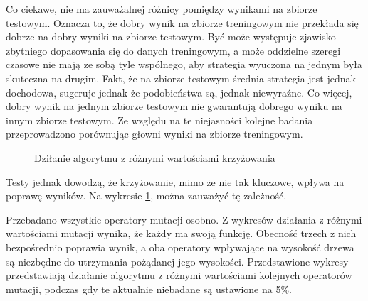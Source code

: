 \documentclass[twoside]{iisthesis}
\begin{document}
Co ciekawe, nie ma zauważalnej różnicy pomiędzy wynikami na zbiorze testowym. Oznacza to, że dobry wynik na zbiorze treningowym nie przekłada się dobrze na dobry wyniki na zbiorze testowym. Być może występuje zjawisko zbytniego dopasowania się do danych treningowym, a może oddzielne szeregi czasowe nie mają ze sobą tyle wspólnego, aby strategia wyuczona na jednym była skuteczna na drugim. Fakt, że na zbiorze testowym średnia strategia jest jednak dochodowa, sugeruje jednak że podobieństwa są, jednak niewyraźne. Co więcej, dobry wynik na jednym zbiorze testowym nie gwarantują dobrego wyniku na innym zbiorze testowym. Ze względu na te niejasności kolejne badania przeprowadzono porównując głowni wyniki na zbiorze treningowym.
 
\begin{figure}[h]
\caption{Dziłanie algorytmu z różnymi wartościami krzyżowania}
\centering
\label{wykresKrzyzowanie}
\end{figure}

Testy jednak dowodzą, że krzyżowanie, mimo że nie tak kluczowe, wpływa na poprawę wyników. Na wykresie \ref{wykresKrzyzowanie}, można zauważyć tę zależność.

Przebadano wszystkie operatory mutacji osobno. Z wykresów działania z różnymi wartościami mutacji wynika, że każdy ma swoją funkcję. Obecność trzech z nich bezpośrednio poprawia wynik, a oba operatory wpływające na wysokość drzewa są niezbędne do utrzymania pożądanej jego wysokości. Przedstawione wykresy przedstawiają działanie algorytmu z różnymi wartościami kolejnych operatorów mutacji, podczas gdy te aktualnie niebadane są ustawione na 5\%.
\end{document}
